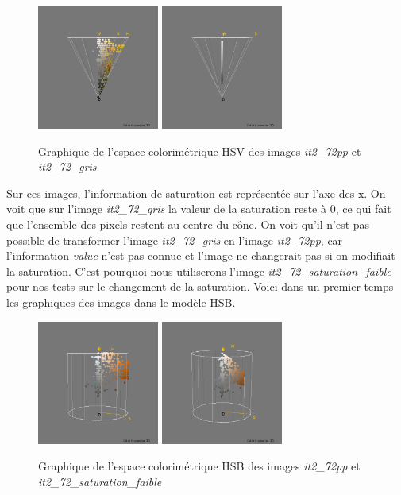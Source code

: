 \documentclass[a4paper,10pt]{article}
\begin{document}
\begin{figure}[!h]
 \begin{center}
 \includegraphics[width=4cm]{resultat/saturation1.png}
 \includegraphics[width=4cm]{resultat/saturation2.png}
 \caption{Graphique de l'espace colorimétrique HSV des images \textit{it2\_72pp} et \textit{it2\_72\_gris}}
 \end{center}
\end{figure}

Sur ces images, l'information de saturation est représentée sur l'axe des x. On voit que sur l'image \textit{it2\_72\_gris} la
valeur de la saturation reste à 0, ce qui fait que l'ensemble des pixels restent au centre du cône. On voit qu'il n'est pas
possible de transformer l'image \textit{it2\_72\_gris} en l'image \textit{it2\_72pp}, car l'information \textit{value} n'est pas
connue et l'image ne changerait pas si on modifiait la saturation. C'est pourquoi nous utiliserons l'image \textit{it2\_72\_saturation\_faible}
pour nos tests sur le changement de la saturation. Voici dans un premier temps les graphiques des images dans le modèle HSB.

\begin{figure}[!h]
 \begin{center}
 \includegraphics[width=4cm]{resultat/saturation1_2.png}
 \includegraphics[width=4cm]{resultat/saturation2_2.png}
 \caption{Graphique de l'espace colorimétrique HSB des images \textit{it2\_72pp} et \textit{it2\_72\_saturation\_faible}}
 \end{center}
\end{figure}
\newpage
\end{document}
